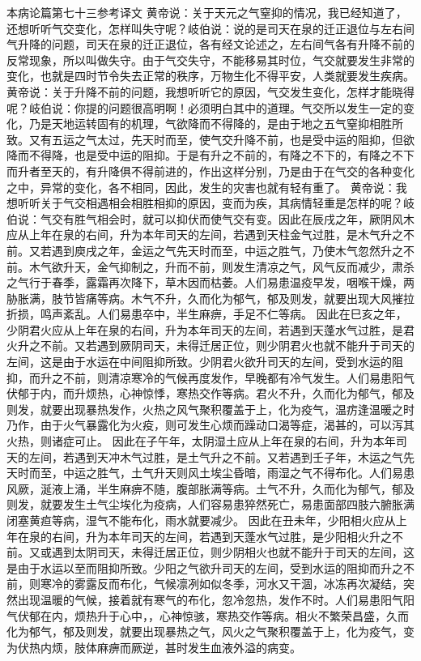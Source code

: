 \documentclass[a4paper,12pt,UTF8,twoside]{ctexbook}
\begin{document}
本病论篇第七十三参考译文
黄帝说：关于天元之气窒抑的情况，我已经知道了，还想听听气交变化，怎样叫失守呢？岐伯说：说的是司天在泉的迁正退位与左右间气升降的问题，司天在泉的迁正退位，各有经文论述之，左右间气各有升降不前的反常现象，所以叫做失守。由于气交失守，不能移易其时位，气交就要发生非常的变化，也就是四时节令失去正常的秩序，万物生化不得平安，人类就要发生疾病。
黄帝说：关于升降不前的问题，我想听听它的原因，气交发生变化，怎样才能晓得呢？岐伯说：你提的问题很高明啊！必须明白其中的道理。气交所以发生一定的变化，乃是天地运转固有的机理，气欲降而不得降的，是由于地之五气窒抑相胜所致。又有五运之气太过，先天时而至，使气交升降不前，也是受中运的阻抑，但欲降而不得降，也是受中运的阻抑。于是有升之不前的，有降之不下的，有降之不下而升者至天的，有升降俱不得前进的，作出这样分别，乃是由于在气交的各种变化之中，异常的变化，各不相同，因此，发生的灾害也就有轻有重了。
黄帝说：我想听听关于气交相遇相会相胜相抑的原因，变而为疾，其病情轻重是怎样的呢？岐伯说：气交有胜气相会时，就可以抑伏而使气交有变。因此在辰戌之年，厥阴风木应从上年在泉的右间，升为本年司天的左间，若遇到天柱金气过胜，是木气升之不前。又若遇到庾戌之年，金运之气先天时而至，中运之胜气，乃使木气忽然升之不前。木气欲升天，金气抑制之，升而不前，则发生清凉之气，风气反而减少，肃杀之气行于春季，露霜再次降下，草木因而枯萎。人们易患温疫早发，咽喉干燥，两胁胀满，肢节皆痛等病。木气不升，久而化为郁气，郁及则发，就要出现大风摧拉折损，鸣声紊乱。人们易患卒中，半生麻痹，手足不仁等病。
因此在巳亥之年，少阴君火应从上年在泉的右间，升为本年司天的左间，若遇到天蓬水气过胜，是君火升之不前。又若遇到厥阴司天，未得迁居正位，则少阴君火也就不能升于司天的左间，这是由于水运在中间阻抑所致。少阴君火欲升司天的左间，受到水运的阻抑，而升之不前，则清凉寒冷的气候再度发作，早晚都有冷气发生。人们易患阳气伏郁于内，而升烦热，心神惊悸，寒热交作等病。君火不升，久而化为郁气，郁及则发，就要出现暴热发作，火热之风气聚积覆盖于上，化为疫气，温疠逢温暖之时乃作，由于火气暴露化为火疫，则可发生心烦而躁动口渴等症，渴甚的，可以泻其火热，则诸症可止。
因此在子午年，太阴湿土应从上年在泉的右间，升为本年司天的左间，若遇到天冲木气过胜，是土气升之不前。又若遇到壬子年，木运之气先天时而至，中运之胜气，土气升天则风土埃尘昏暗，雨湿之气不得布化。人们易患风厥，涎液上涌，半生麻痹不随，腹部胀满等病。土气不升，久而化为郁气，郁及则发，就要发生土气尘埃化为疫病，人们容易患猝然死亡，易患面部四肢六腑胀满闭塞黄疸等病，湿气不能布化，雨水就要减少。
因此在丑未年，少阳相火应从上年在泉的右间，升为本年司天的左间，若遇到天蓬水气过胜，是少阳相火升之不前。又或遇到太阴司天，未得迁居正位，则少阴相火也就不能升于司天的左间，这是由于水运以至而阻抑所致。少阳之气欲升司天的左间，受到水运的阻抑而升之不前，则寒冷的雾露反而布化，气候凛冽如似冬季，河水又干涸，冰冻再次凝结，突然出现温暖的气候，接着就有寒气的布化，忽冷忽热，发作不时。人们易患阳气阳气伏郁在内，烦热升于心中，，心神惊骇，寒热交作等病。相火不繁荣昌盛，久而化为郁气，郁及则发，就要出现暴热之气，风火之气聚积覆盖于上，化为疫气，变为伏热内烦，肢体麻痹而厥逆，甚时发生血液外溢的病变。
\end{document}
